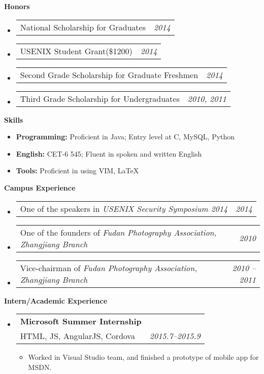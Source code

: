 \documentclass[letterpaper,10pt]{article}
\makeatletter
\newcommand{\resitem}[1]{\item #1 \vspace{-2pt}}
\newcommand{\resheading}[1]{{\large \colorbox{mygrey}{\begin{minipage}{\textwidth}{\textbf{#1 \vphantom{p\^{E}}}}\end{minipage}}}}
\newcommand{\ressubheading}[4]{
\begin{tabular*}{6.5in}{l@{\extracolsep{\fill}}r}
		\textbf{#1} & #2 \\
		#3 & #4 \\
\end{tabular*}\vspace{-6pt}}
\newcommand{\cvitem}[2]{
\begin{tabular*}{6.5in}{l@{\extracolsep{\fill}}r}
		#1 & #2 \\
\end{tabular*}\vspace{-1pt}}
\makeatother
\begin{document}
\resheading{Honors}
	\begin{itemize}
		\item \cvitem{National Scholarship for Graduates}{\emph{2014}}
		\item \cvitem{USENIX Student Grant(\$1200)}{\emph{2014}}
		\item \cvitem{Second Grade Scholarship for Graduate Freshmen}{\emph{2014}}
		\item \cvitem{Third Grade Scholarship for Undergraduates}{\emph{2010, 2011}}
	\end{itemize}

\resheading{Skills}
	\begin{itemize}
		\item
            \textbf{Programming:} Proficient in Java; Entry level at C, MySQL, Python
        \item    
            \textbf{English:} CET-6 545; Fluent in spoken and written English
        \item   
            \textbf{Tools:} Proficient in using VIM, \LaTeX 
	\end{itemize} %

\resheading{Campus Experience}
	\begin{itemize}
		\item \cvitem{One of the speakers in \emph{USENIX Security Symposium 2014}}{\emph{2014}}
		\item \cvitem{One of the founders of \emph{Fudan Photography Association, Zhangjiang Branch}}{\emph{2010}}
		\item \cvitem{Vice-chairman of \emph{Fudan Photography Association, Zhangjiang Branch}}{\emph{2010 -- 2011}}
	\end{itemize}


\resheading{Intern/Academic Experience}
	\begin{itemize}
		\item 
			\ressubheading{Microsoft Summer Internship}{}{HTML, JS, AngularJS, Cordova}{\emph{2015.7--2015.9}}
			{\begin{itemize}
				\resitem {Worked in Visual Studio team, and finished a prototype of mobile app for MSDN.}
			\end{itemize}}

	\end{itemize}
\end{document}

